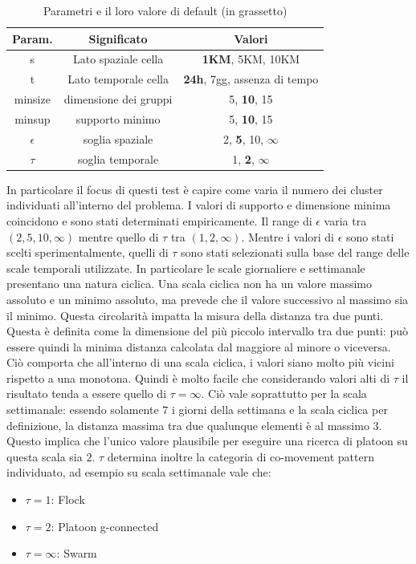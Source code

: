 \begin{table}[H]
    \centering
   \begin{tabular}{||c c c||}
 \hline
     Param. & Significato & Valori \\ [0.4ex] 
 \hline\hline
   s & Lato spaziale cella & \textbf{1KM}, 5KM, 10KM \\
   \hline
   t & Lato temporale cella & \textbf{24h}, 7gg, assenza di tempo \\
   \hline
   minsize & dimensione dei gruppi & 5, \textbf{10}, 15 \\
   \hline
   minsup & supporto minimo & 5, \textbf{10}, 15 \\
   \hline
   \(\epsilon\) & soglia spaziale & 2, \textbf{5}, 10, \(\infty\) \\
   \hline
   \(\tau\) & soglia temporale & 1, \textbf{2}, \(\infty\) \\
 \hline
\end{tabular}
    \caption{Parametri e il loro valore di default (in grassetto)}
    \label{tab:parameters-variation}
\end{table}

In particolare il focus di questi test è capire come varia il numero dei cluster individuati all'interno del problema.
I valori di supporto e dimensione minima coincidono e sono stati determinati empiricamente.
Il range di \(\epsilon\) varia tra \((2, 5, 10, \infty)\) mentre quello di \(\tau\) tra \((1, 2, \infty)\).
Mentre i valori di \(\epsilon\) sono stati scelti sperimentalmente, quelli di \(\tau\) sono stati selezionati sulla base del range delle scale temporali utilizzate.
In particolare le scale giornaliere e settimanale presentano una natura ciclica.
Una scala ciclica non ha un valore massimo assoluto e un minimo assoluto, ma prevede che il valore successivo al massimo sia il minimo.
Questa circolarità impatta la misura della distanza tra due punti.
Questa è definita come la dimensione del più piccolo intervallo tra due punti: può essere quindi la minima distanza calcolata dal maggiore al minore o viceversa.
Ciò comporta che all'interno di una scala ciclica, i valori siano molto più vicini rispetto a una monotona.
Quindi è molto facile che considerando valori alti di \(\tau\) il risultato tenda a essere quello di \(\tau = \infty\).
Ciò vale soprattutto per la scala settimanale: essendo solamente \(7\) i giorni della settimana e la scala ciclica per definizione, la distanza massima tra due qualunque elementi è al massimo \(3\).
Questo implica che l'unico valore plausibile per eseguire una ricerca di platoon su questa scala sia \(2\).
\(\tau\) determina inoltre la categoria di co-movement pattern individuato, ad esempio su scala settimanale vale che:
\begin{itemize}
    \item \(\tau = 1\): Flock
    \item \(\tau = 2\): Platoon g-connected
    \item \(\tau = \infty\): Swarm
\end{itemize}

